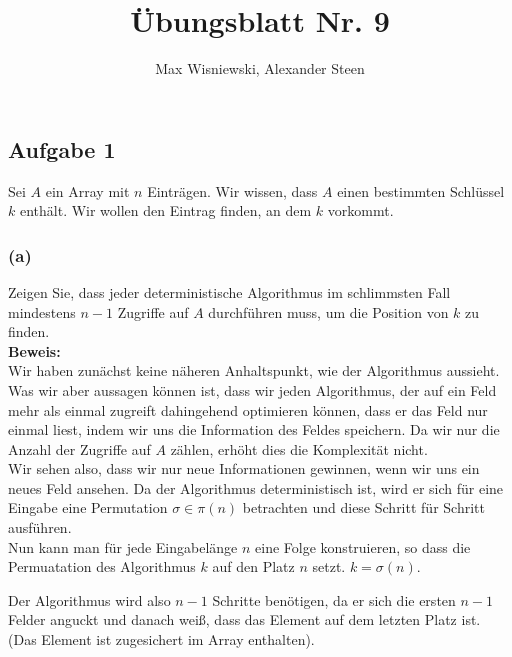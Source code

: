 \documentclass[11pt,a4paper,ngerman]{article}
\date{}
\title{Übungsblatt Nr. 9}
\author{Max Wisniewski, Alexander Steen}
\begin{document}
\renewcommand{\figurename}{Figure}
\maketitle
\thispagestyle{fancy}

    
\subsection*{Aufgabe 1}

Sei $A$ ein Array mit $n$ Einträgen. Wir wissen, dass $A$ einen bestimmten Schlüssel $k$ enthält. Wir
wollen den Eintrag finden, an dem $k$ vorkommt.

\subsubsection*{(a)}

Zeigen Sie, dass jeder deterministische Algorithmus im schlimmsten Fall mindestens $n-1$ Zugriffe auf $A$ durchführen muss,
um die Position von $k$ zu finden.\\

\textbf{Beweis:}\\

Wir haben zunächst keine näheren Anhaltspunkt, wie der Algorithmus aussieht. Was wir aber aussagen können ist, dass wir
jeden Algorithmus, der auf ein Feld mehr als einmal zugreift dahingehend optimieren können, dass er das Feld nur einmal
liest, indem wir uns die Information des Feldes speichern. Da wir nur die Anzahl der Zugriffe auf $A$ zählen, erhöht dies
die Komplexität nicht.\\

Wir sehen also, dass wir nur neue Informationen gewinnen, wenn wir uns ein neues Feld ansehen. Da der Algorithmus deterministisch ist,
wird er sich für eine Eingabe eine Permutation $\sigma \in \pi (n)$ betrachten und diese Schritt für Schritt ausführen.\\

Nun kann man für jede Eingabelänge $n$ eine Folge konstruieren, so dass die Permuatation des Algorithmus $k$ auf den Platz
$n$ setzt. $k = \sigma (n)$.

Der Algorithmus wird also $n-1$ Schritte benötigen, da er sich die ersten $n-1$ Felder anguckt und danach weiß,
dass das Element auf dem letzten Platz ist. (Das Element ist zugesichert im Array enthalten).\\
\end{document}

